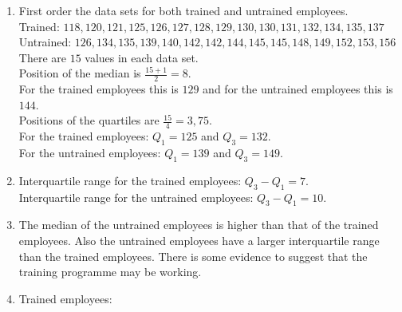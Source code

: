 \begin{eocsolutions}{}
{}
\item %
\begin{enumerate}[noitemsep, label=\textbf{(\alph*)} ]
\item
First order the data sets for both trained and untrained employees.\\
Trained: $118, 120, 121, 125, 126, 127, 128, 129, 130, 130, 131, 132, 134, 135, 137$ \\
Untrained: $126, 134, 135, 139, 140, 142, 142, 144, 145, 145, 148, 149, 152, 153, 156$ \\
There are $15$ values in each data set. \\
Position of the median is $\frac{15+1}{2}=8$. \\
For the trained employees this is $129$ and for the untrained employees this is $144$.\\
Positions of the quartiles are $\frac{15}{4}=3,75$.\\
For the trained employees: $Q_1=125$ and $Q_3=132$.\\
For the untrained employees: $Q_1=139$ and $Q_3=149$.\\
\item
Interquartile range for the trained employees: $Q_3-Q_1=7$.\\
Interquartile range for the untrained employees: $Q_3-Q_1=10$.\\
\item
The median of the untrained employees is higher than that of the trained employees. Also the untrained employees have a larger interquartile range than the trained employees. There is some evidence to suggest that the training programme may be working.
\item %
Trained employees:\\
\end{enumerate}
\end{eocsolutions}

